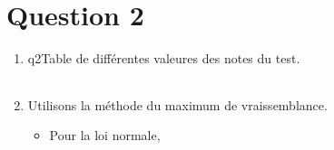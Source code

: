 \section{Question 2}
\begin{enumerate}
  \item
    \begin{mytable}{q2}{Table de différentes valeures des notes du test.}
      \begin{tabular}{ll}
        
      \end{tabular}
    \end{mytable}
  \item Utilisons la méthode du maximum de vraissemblance.
    \begin{itemize}
      \item
        Pour la loi normale,
    \end{itemize}
\end{enumerate}
